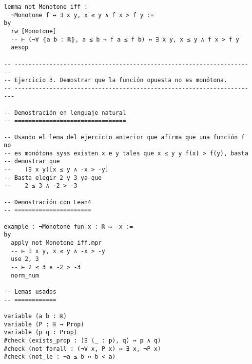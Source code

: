\begin{verbatim}
lemma not_Monotone_iff :
  ¬Monotone f ↔ ∃ x y, x ≤ y ∧ f x > f y :=
by
  rw [Monotone]
  -- ⊢ (¬∀ ⦃a b : ℝ⦄, a ≤ b → f a ≤ f b) ↔ ∃ x y, x ≤ y ∧ f x > f y
  aesop

-- ---------------------------------------------------------------------
-- Ejercicio 3. Demostrar que la función opuesta no es monótona.
-- ----------------------------------------------------------------------

-- Demostración en lenguaje natural
-- ================================

-- Usando el lema del ejercicio anterior que afirma que una función f no
-- es monótona syss existen x e y tales que x ≤ y y f(x) > f(y), basta
-- demostrar que
--    (∃ x y)[x ≤ y ∧ -x > -y]
-- Basta elegir 2 y 3 ya que
--    2 ≤ 3 ∧ -2 > -3

-- Demostración con Lean4
-- ======================

example : ¬Monotone fun x : ℝ ↦ -x :=
by
  apply not_Monotone_iff.mpr
  -- ⊢ ∃ x y, x ≤ y ∧ -x > -y
  use 2, 3
  -- ⊢ 2 ≤ 3 ∧ -2 > -3
  norm_num

-- Lemas usados
-- ============

variable (a b : ℝ)
variable (P : ℝ → Prop)
variable (p q : Prop)
#check (exists_prop : (∃ (_ : p), q) ↔ p ∧ q)
#check (not_forall : (¬∀ x, P x) ↔ ∃ x, ¬P x)
#check (not_le : ¬a ≤ b ↔ b < a)
\end{verbatim}

